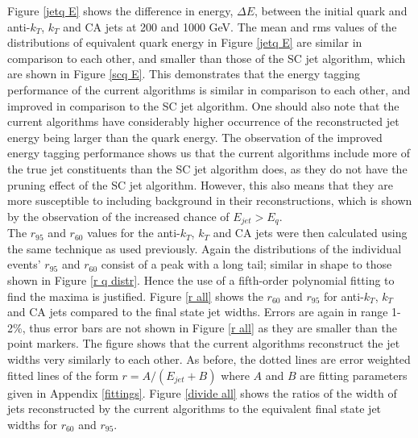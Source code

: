 \documentclass[a4paper,11pt, onecolumn]{article}
\begin{document}
  Figure \ref{jetq E} shows the difference in energy, $\Delta E$, between the initial quark and anti-$k_{T}$, $k_{T}$ and CA jets 
  at 200 and 1000 GeV. The mean and rms values of the distributions of equivalent quark energy in Figure \ref{jetq E} are similar in 
  comparison to each other, and smaller than those of the SC jet algorithm, which are shown in Figure \ref{scq E}.
  This demonstrates that the energy tagging performance of the current algorithms is similar in comparison to each other, and improved in comparison to
  the SC jet algorithm.
  One should also note that the current algorithms have considerably higher occurrence of the reconstructed jet energy being larger than 
  the quark energy. The observation of the improved energy tagging performance shows us that the current algorithms include more of the true
  jet constituents than the SC jet algorithm does, as they do not have the pruning effect of the SC jet algorithm. However, this also means that they are more susceptible to 
  including background in their reconstructions, which is shown by the observation of the increased chance of $E_{jet} > E_q$. \\

  The $r_{95}$ and $r_{60}$ values for the anti-$k_T$, $k_T$ and CA jets were then calculated using the same technique as used previously. Again the
  distributions of the individual events' $r_{95}$ and $r_{60}$ consist of a peak with a long tail; similar in shape to those shown in Figure 
  \ref{r q distr}. Hence the use of a fifth-order polynomial fitting to find the maxima is justified. Figure \ref{r all} shows the $r_{60}$ 
  and $r_{95}$ for anti-$k_{T}$, $k_{T}$ and CA jets compared to the final state jet widths. Errors are again in range 1-2\%, thus error bars 
  are not shown in Figure \ref{r all} as they are smaller than the point markers. The figure shows that the current algorithms reconstruct the 
  jet widths very similarly to each other.  As before, the dotted lines are error weighted fitted lines of the form $r = A/(E_{jet}+B)$ where 
  $A$ and $B$ are fitting parameters given in Appendix \ref{fittings}. Figure \ref{divide all} shows the ratios of the width of jets reconstructed 
  by the current algorithms to the equivalent final state jet widths for $r_{60}$ and $r_{95}$. \\
\end{document}
